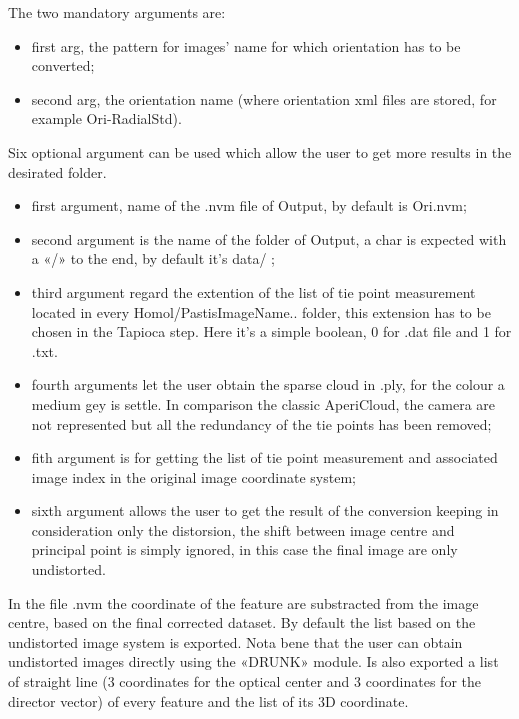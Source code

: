 The two mandatory arguments are:
\begin{itemize}
 \item  first arg, the pattern for images’ name for which orientation has to be converted;
 \item  second arg, the orientation name (where orientation xml files are stored, for example Ori-RadialStd).
\end{itemize}

Six optional argument can be used which allow the user to get more results in the desirated folder.
\begin{itemize}
 \item first argument, name of the .nvm file of Output, by default is Ori.nvm;
 \item second argument is the name of the folder of Output, a char is expected with a «/» to the end, by default it's data/ ;
 \item third argument regard the extention of the list of tie point measurement located in every Homol/PastisImageName.. folder, this extension has to be chosen in the Tapioca step. Here it's a simple boolean, 0 for .dat file and 1 for .txt.

 \item  fourth arguments let the user obtain the sparse cloud in .ply, for the colour a medium gey is settle. In comparison the classic AperiCloud, the camera are not represented but all the redundancy of the tie points has been removed;
 \item  fith argument is for getting the list of tie point measurement and associated image index in the original image coordinate system;
 \item  sixth argument allows the user to get the result of the conversion keeping in consideration only the distorsion, the shift between image centre and principal point is simply ignored, in this case the final image are only undistorted.
\end{itemize}

	In the file .nvm the coordinate of the feature are substracted from the image centre, based on the final corrected dataset. By default the list based on the undistorted image system is exported. Nota bene that the user can obtain undistorted images directly using the «DRUNK» module. Is also exported a list of straight line (3 coordinates for the optical center and 3 coordinates for the director vector) of every feature and the list of its 3D coordinate.



